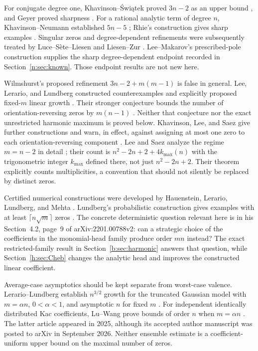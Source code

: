 \documentclass[UTF8,11pt]{ctexart}
\theoremstyle{definition}
\numberwithin{equation}{section}
\begin{document}
For conjugate degree one, Khavinson--\'{S}wi\k{a}tek proved $3n-2$ as an upper bound \cite[Theorem~1, p.~410]{KS03}, and Geyer proved sharpness \cite[Corollary~2, p.~549]{Gey08}. For a rational analytic term of degree $n$, Khavinson--Neumann established $5n-5$ \cite[Theorem~1, \av, p.~1]{KN06}; Rhie's construction gives sharp examples \cite[pp.~3--4]{Rhi03}. Singular zeros and degree-dependent refinements were subsequently treated by Luce--S\`ete--Liesen \cite[Theorem~1.1, \av, p.~2]{LSL15} and Liesen--Zur \cite[Theorem~1.1 and Theorem~3.5, \av, pp.~2, 7]{LZ18}. Lee--Makarov's prescribed-pole construction \cite[Theorem~C, p.~3]{LM14} supplies the sharp degree-dependent endpoint recorded in Section~\ref{n:sec:known}. Those endpoint results are not new here.

Wilmshurst's proposed refinement $3n-2+m(m-1)$ is false in general. Lee, Lerario, and Lundberg constructed counterexamples and explicitly proposed fixed-$m$ linear growth \cite[\av, pp.~1--4]{LLL15}. Their stronger conjecture bounds the number of orientation-reversing zeros by $m(n-1)$ \cite[\av, p.~3]{LLL15}. Neither that conjecture nor the exact unrestricted harmonic maximum is proved below. Khavinson, Lee, and Saez give further constructions and warn, in effect, against assigning at most one zero to each orientation-reversing component \cite[Theorems~2--3, p.~2]{KLS18}. Lee and Saez analyze the regime $m=n-2$ in detail \cite[unnumbered Theorem, \av, p.~1]{LS17}; their count is $n^2-2n+2+4k_{\max}(n)$ with the trigonometric integer $k_{\max}$ defined there, not just $n^2-2n+2$. Their theorem explicitly counts multiplicities, a convention that should not silently be replaced by distinct zeros.

Certified numerical constructions were developed by Hauenstein, Lerario, Lundberg, and Mehta \cite[Section~1.3, \av, p.~3]{HLLM15}. Lundberg's probabilistic construction gives examples with at least $\lceil n\sqrt m\rceil$ zeros \cite[Theorem~1.1, \av, p.~2]{Lun23}. The concrete deterministic question relevant here is in his Section~4.2, page~9 of arXiv:2201.00788v2: can a strategic choice of the coefficients in the monomial-head family produce order $mn$ instead? The exact restricted-family result in Section~\ref{b:sec:harmonic} answers that question, while Section~\ref{h:sec:Cheb} changes the analytic head and improves the constructed linear coefficient.

Average-case asymptotics should be kept separate from worst-case valence.
Lerario--Lundberg establish $n^{3/2}$ growth for the truncated Gaussian
model with $m=\alpha n$, $0<\alpha<1$, and asymptotic $n$ for fixed $m$
\cite[Theorem~1, \av, p.~3]{LL16}. For independent identically distributed
Kac coefficients, Lu--Wang prove bounds of order $n$ when $m=\alpha n$
\cite[Theorem~2.1 and inequalities (2.1)--(2.4), \av, p.~4]{LW25}.
The latter article appeared in 2025, although its accepted author manuscript
was posted to arXiv in September 2026. Neither ensemble estimate is a
coefficient-uniform upper bound on the maximal number of zeros.
\end{document}
